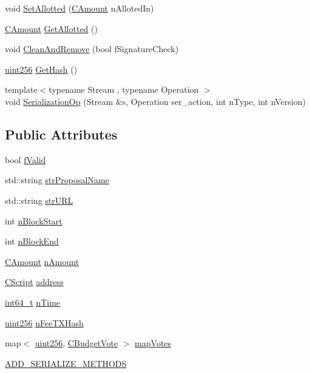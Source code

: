 \begin{DoxyCompactItemize}
void \hyperlink{class_c_budget_proposal_a23188288e26d836dd95c77ee40d2e18e}{Set\+Allotted} (\hyperlink{amount_8h_a4eaf3a5239714d8c45b851527f7cb564}{C\+Amount} n\+Alloted\+In)
\item 
\hyperlink{amount_8h_a4eaf3a5239714d8c45b851527f7cb564}{C\+Amount} \hyperlink{class_c_budget_proposal_aa331bf9bfe44113a3a3ef2880b5f7936}{Get\+Allotted} ()
\item 
void \hyperlink{class_c_budget_proposal_a32204943f3efff468bcf76a92d014424}{Clean\+And\+Remove} (bool f\+Signature\+Check)
\item 
\hyperlink{classuint256}{uint256} \hyperlink{class_c_budget_proposal_a7c69d6e50ef8c4870ab5af71d37ae2b7}{Get\+Hash} ()
\item 
{\footnotesize template$<$typename Stream , typename Operation $>$ }\\void \hyperlink{class_c_budget_proposal_a583bd01ff4267cf5491033ab57a09094}{Serialization\+Op} (Stream \&s, Operation ser\+\_\+action, int n\+Type, int n\+Version)
\end{DoxyCompactItemize}
\subsection*{Public Attributes}
\begin{DoxyCompactItemize}
\item 
bool \hyperlink{class_c_budget_proposal_ab2222fd5e4fc51881d82b9c7dc6a0f10}{f\+Valid}
\item 
std\+::string \hyperlink{class_c_budget_proposal_ab881106333b75bf1a8c5c97d56cd6703}{str\+Proposal\+Name}
\item 
std\+::string \hyperlink{class_c_budget_proposal_ac6ff1965ce0dca34221ec041ae831e83}{str\+U\+R\+L}
\item 
int \hyperlink{class_c_budget_proposal_a40a5d7e56c5ef1636b48bb67e6619e32}{n\+Block\+Start}
\item 
int \hyperlink{class_c_budget_proposal_a384863d009b95fd48d50f41891e41840}{n\+Block\+End}
\item 
\hyperlink{amount_8h_a4eaf3a5239714d8c45b851527f7cb564}{C\+Amount} \hyperlink{class_c_budget_proposal_ad40f0d2ff6c0bef605d405fbcb36136c}{n\+Amount}
\item 
\hyperlink{class_c_script}{C\+Script} \hyperlink{class_c_budget_proposal_abec3e0b5b46ac1a8aad65b4144b87782}{address}
\item 
\hyperlink{stdint_8h_adec1df1b8b51cb32b77e5b86fff46471}{int64\+\_\+t} \hyperlink{class_c_budget_proposal_a73bbfda4189ae03fdecc3d6ddf984a42}{n\+Time}
\item 
\hyperlink{classuint256}{uint256} \hyperlink{class_c_budget_proposal_aba9937f0c86385b04d0fd5eb136ce999}{n\+Fee\+T\+X\+Hash}
\item 
map$<$ \hyperlink{classuint256}{uint256}, \hyperlink{class_c_budget_vote}{C\+Budget\+Vote} $>$ \hyperlink{class_c_budget_proposal_a83239972ab9db545206ac7e59740bfab}{map\+Votes}
\item 
\hyperlink{class_c_budget_proposal_ad35aca18a74a65dd6df2a04536253174}{A\+D\+D\+\_\+\+S\+E\+R\+I\+A\+L\+I\+Z\+E\+\_\+\+M\+E\+T\+H\+O\+D\+S}
\end{DoxyCompactItemize}


